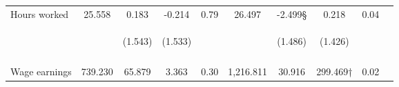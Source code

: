 \begin{table}[h!]
{\begin{tabular}{lccccccccc}
\noalign{\smallskip}Hours worked & 25.558 & 0.183 & -0.214 & 0.79 & 26.497 & -2.499§ & 0.218 & 0.04 & \\
 & \begin{footnotesize}\end{footnotesize} & \begin{footnotesize}(1.543)\end{footnotesize} & \begin{footnotesize}(1.533)\end{footnotesize} & \begin{footnotesize}\end{footnotesize} & \begin{footnotesize}\end{footnotesize} & \begin{footnotesize}(1.486)\end{footnotesize} & \begin{footnotesize}(1.426)\end{footnotesize} & \begin{footnotesize}\end{footnotesize} & \begin{footnotesize}\end{footnotesize}\\
 & \begin{footnotesize}\end{footnotesize} & \begin{footnotesize}[0.837]\end{footnotesize} & \begin{footnotesize}[1.000]\end{footnotesize} & \begin{footnotesize}\end{footnotesize} & \begin{footnotesize}\end{footnotesize} & \begin{footnotesize}[0.411]\end{footnotesize} & \begin{footnotesize}[1.000]\end{footnotesize} & \begin{footnotesize}\end{footnotesize} & \begin{footnotesize}\end{footnotesize}\\
\noalign{\smallskip}Wage earnings & 739.230 & 65.879 & 3.363 & 0.30 & 1,216.811 & 30.916 & 299.469† & 0.02 & \\

\end{tabular}}
\end{table}
